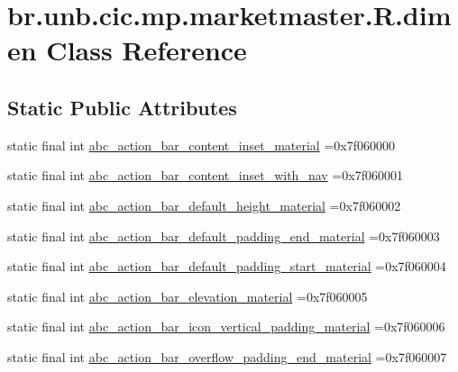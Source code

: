 \hypertarget{classbr_1_1unb_1_1cic_1_1mp_1_1marketmaster_1_1R_1_1dimen}{}\section{br.\+unb.\+cic.\+mp.\+marketmaster.\+R.\+dimen Class Reference}
\label{classbr_1_1unb_1_1cic_1_1mp_1_1marketmaster_1_1R_1_1dimen}
\subsection*{Static Public Attributes}
\begin{DoxyCompactItemize}
\item 
static final int \mbox{\hyperlink{classbr_1_1unb_1_1cic_1_1mp_1_1marketmaster_1_1R_1_1dimen_a30b76e32481d5ff789e925eecc53d360}{abc\+\_\+action\+\_\+bar\+\_\+content\+\_\+inset\+\_\+material}} =0x7f060000
\item 
static final int \mbox{\hyperlink{classbr_1_1unb_1_1cic_1_1mp_1_1marketmaster_1_1R_1_1dimen_a66dd091417980a4885f35c0064dd4bb8}{abc\+\_\+action\+\_\+bar\+\_\+content\+\_\+inset\+\_\+with\+\_\+nav}} =0x7f060001
\item 
static final int \mbox{\hyperlink{classbr_1_1unb_1_1cic_1_1mp_1_1marketmaster_1_1R_1_1dimen_a0ed3ee39c0bb8eec6537e93ca0d7deab}{abc\+\_\+action\+\_\+bar\+\_\+default\+\_\+height\+\_\+material}} =0x7f060002
\item 
static final int \mbox{\hyperlink{classbr_1_1unb_1_1cic_1_1mp_1_1marketmaster_1_1R_1_1dimen_aa42d860e4e7ded3ce6eaed91b81eda6b}{abc\+\_\+action\+\_\+bar\+\_\+default\+\_\+padding\+\_\+end\+\_\+material}} =0x7f060003
\item 
static final int \mbox{\hyperlink{classbr_1_1unb_1_1cic_1_1mp_1_1marketmaster_1_1R_1_1dimen_a20465050fc6b05d835fdd52a604d5f1d}{abc\+\_\+action\+\_\+bar\+\_\+default\+\_\+padding\+\_\+start\+\_\+material}} =0x7f060004
\item 
static final int \mbox{\hyperlink{classbr_1_1unb_1_1cic_1_1mp_1_1marketmaster_1_1R_1_1dimen_a7298e265a259fe58df0cf95da67bcc56}{abc\+\_\+action\+\_\+bar\+\_\+elevation\+\_\+material}} =0x7f060005
\item 
static final int \mbox{\hyperlink{classbr_1_1unb_1_1cic_1_1mp_1_1marketmaster_1_1R_1_1dimen_ac528423118ccf70a327123a8f987544b}{abc\+\_\+action\+\_\+bar\+\_\+icon\+\_\+vertical\+\_\+padding\+\_\+material}} =0x7f060006
\item 
static final int \mbox{\hyperlink{classbr_1_1unb_1_1cic_1_1mp_1_1marketmaster_1_1R_1_1dimen_a2c9fc40345d07de11a614a4056aae07e}{abc\+\_\+action\+\_\+bar\+\_\+overflow\+\_\+padding\+\_\+end\+\_\+material}} =0x7f060007

\end{DoxyCompactItemize}
